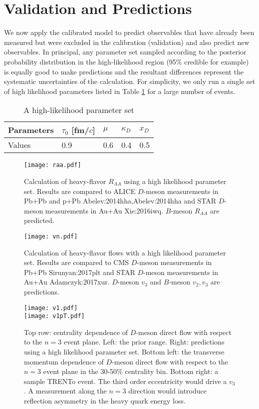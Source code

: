 \section{Validation and Predictions}\label{section:prediction}
We now apply the calibrated model to predict observables that have already been measured but were excluded in the calibration (validation) and also predict new observables.
In principal, any parameter set sampled according to the posterior probability distribution in the high-likelihood region (95\% credible for example) is equally good to make predictions and the resultant differences represent the systematic uncertainties of the calculation.
For simplicity, we only run a single set of high likelihood parameters listed in Table \ref{table:high-likelihood-parameters} for a large number of events.
\begin{table}
\caption{A high-likelihood parameter set}\label{table:high-likelihood-parameters}
\begin{tabularx}{\columnwidth}{XXXXX}
\hline
Parameters & $\tau_0$ [fm/$c$] & $\mu$ & $\kappa_D$ & $x_D$   \\
\hline
Values & 0.9 & 0.6 & 0.4 & 0.5\\
\hline
\end{tabularx}
\end{table} 
\begin{figure*}
\texttt{[image: raa.pdf]}
\caption{Calculation of heavy-flavor $R_{AA}$ using a high likelihood parameter set. Results are compared to ALICE $D$-meson measurements in Pb+Pb and p+Pb {Abelev:2014hha,Abelev:2014hha} and STAR $D$-meson measurements in Au+Au {Xie:2016iwq}. $B$-meson $R_{AA}$ are predicted.}\label{plots:pred:raa}
\end{figure*}
\begin{figure*}
\texttt{[image: vn.pdf]}
\caption{Calculation of heavy-flavor flows with a high likelihood parameter set. Results are compared to CMS $D$-meson measurements in Pb+Pb {Sirunyan:2017plt} and STAR $D$-meson measurements in Au+Au {Adamczyk:2017xur}. $D$-meson $v_3$ and $B$-meson $v_2, v_3$ are predictions.}\label{plots:pred:vn}
\end{figure*}
\begin{figure}
\texttt{[image: v1.pdf]}\\
\texttt{[image: v1pT.pdf]}
\caption{Top row: centrality dependence of $D$-meson direct flow with respect to the $n=3$ event plane. Left: the prior range. Right: predictions using a high likelihood parameter set. Bottom left: the transverse momentum dependence of $D$-meson direct flow with respect to the $n=3$ event plane in the 30-50\% centrality bin. Bottom right: a sample TRENTo event. The third order eccentricity would drive a $v_3$. A measurement along the $n=3$ direction would introduce reflection asymmetry in the heavy quark energy loss.}\label{plots:pred:v1}
\end{figure}
